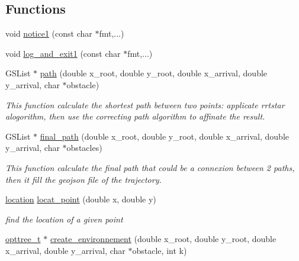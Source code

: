 \subsection*{\-Functions}
\begin{DoxyCompactItemize}
\item 
void \hyperlink{a00016_abb72a9e5586947ffa14de7aea6c8d7b4_abb72a9e5586947ffa14de7aea6c8d7b4}{notice1} (const char $\ast$fmt,...)
\item 
void \hyperlink{a00016_ab369473e6f056b28d426c97004c47828_ab369473e6f056b28d426c97004c47828}{log\-\_\-and\-\_\-exit1} (const char $\ast$fmt,...)
\item 
\-G\-S\-List $\ast$ \hyperlink{a00016_a5fbe870a8fdafd7aedaf1591ffb214a9_a5fbe870a8fdafd7aedaf1591ffb214a9}{path} (double x\-\_\-root, double y\-\_\-root, double x\-\_\-arrival, double y\-\_\-arrival, char $\ast$obstacle)
\begin{DoxyCompactList}\small\item\em \-This function calculate the shortest path between two points\-: applicate rrtstar alogorithm, then use the correcting path algorithm to affinate the result. \end{DoxyCompactList}\item 
\-G\-S\-List $\ast$ \hyperlink{a00016_afd836348eeb1fd77cd7967c9ba1a08fb_afd836348eeb1fd77cd7967c9ba1a08fb}{final\-\_\-path} (double x\-\_\-root, double y\-\_\-root, double x\-\_\-arrival, double y\-\_\-arrival, char $\ast$obstacles)
\begin{DoxyCompactList}\small\item\em \-This function calculate the final path that could be a connexion between 2 paths, then it fill the geojson file of the trajectory. \end{DoxyCompactList}\item 
\hyperlink{a00016_a5f269c22e6d9d32b0b0ad7e6166854df_a5f269c22e6d9d32b0b0ad7e6166854df}{location} \hyperlink{a00016_a8fccd24d5b565d686f8ffd2820bf372a_a8fccd24d5b565d686f8ffd2820bf372a}{locat\-\_\-point} (double x, double y)
\begin{DoxyCompactList}\small\item\em find the location of a given point \end{DoxyCompactList}\item 
\hyperlink{a00020_a07b75293fafb6f31b7e9f723848ad105_a07b75293fafb6f31b7e9f723848ad105}{opttree\-\_\-t} $\ast$ \hyperlink{a00016_ad57de17f688b7fd9ae8db3dee4c728a3_ad57de17f688b7fd9ae8db3dee4c728a3}{create\-\_\-environnement} (double x\-\_\-root, double y\-\_\-root, double x\-\_\-arrival, double y\-\_\-arrival, char $\ast$obstacle, int k)

\end{DoxyCompactItemize}
